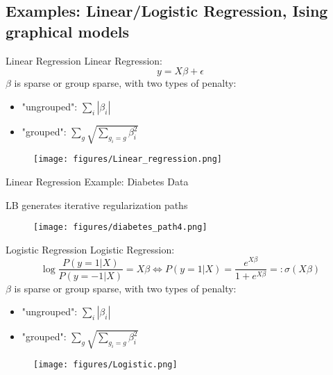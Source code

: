\documentclass[slidestop,compress,9pt,epsfig,color]{beamer}
\theoremstyle{example}
\begin{document}
\subsection{Examples: Linear/Logistic Regression, Ising graphical models}
%
\begin{frame}{Linear Regression}
Linear Regression:
$$y = X\beta + \epsilon$$
$\beta$ is sparse or group sparse, with two types of penalty:
\begin{itemize}
\item "ungrouped": $\sum_i |\beta_i|$
\item "grouped": $\sum_{g}\sqrt{\sum_{g_i=g}\beta_i^2}$
\end{itemize}
\begin{figure}[!h]
\texttt{[image: figures/Linear\_regression.png]}  
\end{figure}
\end{frame}


\begin{frame}{Linear Regression Example: Diabetes Data}
\tiny{}
\end{frame}


\begin{frame}{LB generates iterative regularization paths}
\begin{figure}[!h]
\texttt{[image: figures/diabetes\_path4.png]}  \\
\end{figure}
\end{frame}


\begin{frame}{Logistic Regression}
Logistic Regression:
$$\log \frac{P(y=1|X)}{P(y=-1|X)} = X \beta \Leftrightarrow P(y=1|X) = \frac{e^{X\beta}}{1+e^{X\beta}}=:\sigma(X\beta) $$
$\beta$ is sparse or group sparse, with two types of penalty:
\begin{itemize}
\item "ungrouped": $\sum_i |\beta_i|$
\item "grouped": $\sum_{g}\sqrt{\sum_{g_i=g}\beta_i^2}$
\end{itemize}
\begin{figure}[!h]
\texttt{[image: figures/Logistic.png]}  
\end{figure}
\end{frame}
\end{document}
